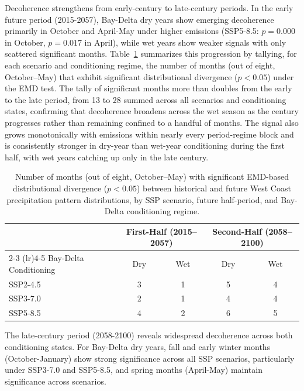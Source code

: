 Decoherence strengthens from early-century to late-century periods.
%
In the early future period (2015-2057), Bay-Delta dry years show emerging decoherence primarily in October and April-May under higher emissions (SSP5-8.5: $p = 0.000$ in October, $p = 0.017$ in April), while wet years show weaker signals with only scattered significant months.
%
Table~\ref{tab:emd_sig_counts} summarizes this progression by tallying, for each scenario and conditioning regime, the number of months (out of eight, October--May) that exhibit significant distributional divergence ($p < 0.05$) under the EMD test.
%
The tally of significant months more than doubles from the early to the late period, from 13 to 28 summed across all scenarios and conditioning states, confirming that decoherence broadens across the wet season as the century progresses rather than remaining confined to a handful of months.
%
The signal also grows monotonically with emissions within nearly every period-regime block and is consistently stronger in dry-year than wet-year conditioning during the first half, with wet years catching up only in the late century.

\begin{table}[t]
    \centering
    \begin{tabular}{lcccc}
        \toprule
        & \multicolumn{2}{c}{First-Half (2015--2057)} & \multicolumn{2}{c}{Second-Half (2058--2100)} \\
        \cmidrule(lr){2-3} \cmidrule(lr){4-5}
        Bay-Delta Conditioning & Dry & Wet & Dry & Wet \\
        \midrule
        SSP2-4.5 & 3 & 1 & 5  & 4  \\
        SSP3-7.0 & 2 & 1 & 4  & 4  \\
        SSP5-8.5 & 4 & 2 & 6  & 5  \\
        \bottomrule
    \end{tabular}
    \caption{Number of months (out of eight, October--May) with significant EMD-based distributional divergence ($p < 0.05$) between historical and future West Coast precipitation pattern distributions, by SSP scenario, future half-period, and Bay-Delta conditioning regime.}
    \label{tab:emd_sig_counts}
\end{table}

%
The late-century period (2058-2100) reveals widespread decoherence across both conditioning states.
%
For Bay-Delta dry years, fall and early winter months (October-January) show strong significance across all SSP scenarios, particularly under SSP3-7.0 and SSP5-8.5, and spring months (April-May) maintain significance across scenarios.

